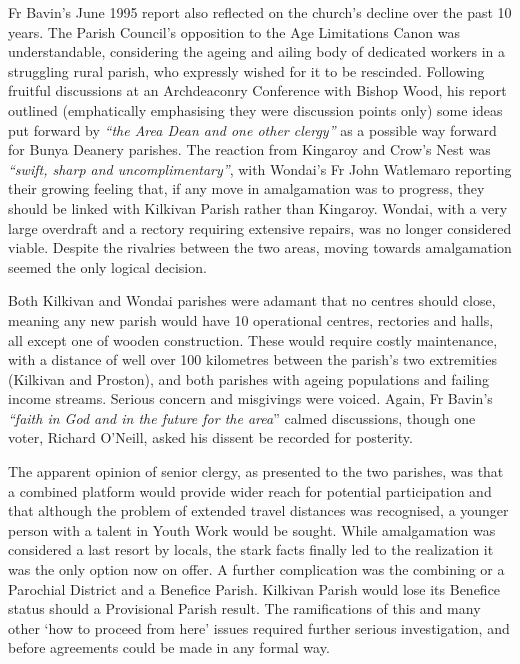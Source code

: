 Fr Bavin's June 1995 report also reflected on the church's decline over the past 10 years. The Parish Council's opposition to the Age Limitations Canon was understandable, considering the ageing and ailing body of dedicated workers in a struggling rural parish, who expressly wished for it to be rescinded. Following fruitful discussions at an Archdeaconry Conference with Bishop Wood, his report outlined (emphatically emphasising they were discussion points only) some ideas put forward by \emph{``the Area Dean and one other clergy''} as a possible way forward for Bunya Deanery parishes. The reaction from Kingaroy and Crow's Nest was \emph{``swift, sharp and uncomplimentary''}, with Wondai's Fr John Watlemaro reporting their growing feeling that, if any move in amalgamation was to progress, they should be linked with Kilkivan Parish rather than Kingaroy. Wondai, with a very large overdraft and a rectory requiring extensive repairs, was no longer considered viable. Despite the rivalries between the two areas, moving towards amalgamation seemed the only logical decision.



Both Kilkivan and Wondai parishes were adamant that no centres should close, meaning any new parish would have 10 operational centres, rectories and halls, all except one of wooden construction. These would require costly maintenance, with a distance of well over 100 kilometres between the parish's two extremities (Kilkivan and Proston), and both parishes with ageing populations and failing income streams. Serious concern and misgivings were voiced. Again, Fr Bavin's \emph{``faith in God and in the future for the area}'' calmed discussions, though one voter, Richard O'Neill, asked his dissent be recorded for posterity.



The apparent opinion of senior clergy, as presented to the two parishes, was that a combined platform would provide wider reach for potential participation and that although the problem of extended travel distances was recognised, a younger person with a talent in Youth Work would be sought. While amalgamation was considered a last resort by locals, the stark facts finally led to the realization it was the only option now on offer. A further complication was the combining or a Parochial District and a Benefice Parish. Kilkivan Parish would lose its Benefice status should a Provisional Parish result. The ramifications of this and many other `how to proceed from here' issues required further serious investigation, and before agreements could be made in any formal way.



